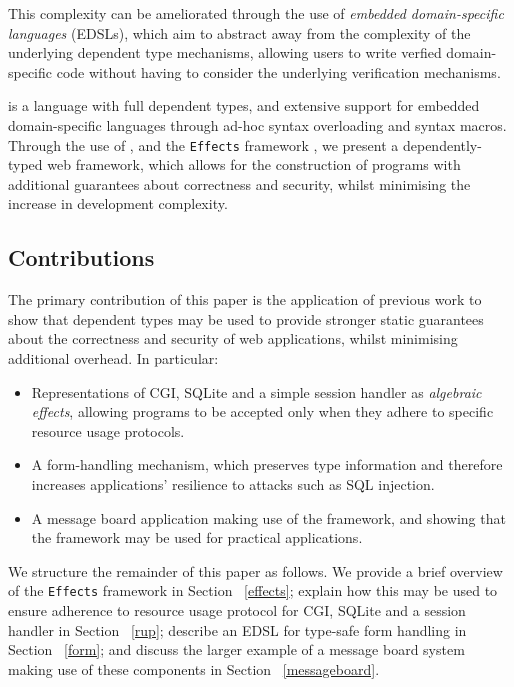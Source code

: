 \documentclass[preprint]{sigplanconf}
\begin{document}
This complexity can be ameliorated through the use of \textit{embedded domain-specific languages} (EDSLs), which aim to abstract away from the complexity of the underlying dependent type mechanisms, allowing users to write verfied domain-specific code without having to consider the underlying verification mechanisms.   %

\idris{} \cite{brady2011idris} is a language with full dependent types, and extensive support for embedded domain-specific languages through ad-hoc syntax overloading and syntax macros. Through the use of \idris{}, and the \texttt{Effects} framework \cite{brady:effects}, we present a dependently-typed web framework, which allows for the construction of programs with additional guarantees about correctness and security, whilst minimising the increase in development complexity. 

\subsection{Contributions}
The primary contribution of this paper is the application of previous work to show that dependent types may be used to provide stronger static guarantees about the correctness and security of web applications, whilst minimising additional overhead. In particular:

\begin{itemize}
\item Representations of CGI, SQLite and a simple session handler as \textit{algebraic effects}, allowing programs to be accepted only when they adhere to specific resource usage protocols.
\item A form-handling mechanism, which preserves type information and therefore increases applications' resilience to attacks such as SQL injection.
\item A message board application making use of the framework, and showing that the framework may be used for practical applications.
\end{itemize}

We structure the remainder of this paper as follows. We provide a brief overview of the \texttt{Effects} framework in Section ~\ref{effects}; explain how this may be used to ensure adherence to resource usage protocol for CGI, SQLite and a session handler in Section ~\ref{rup}; describe an EDSL for type-safe form handling in Section ~\ref{form}; and discuss the larger example of a message board system making use of these components in Section ~\ref{messageboard}.
\end{document}

